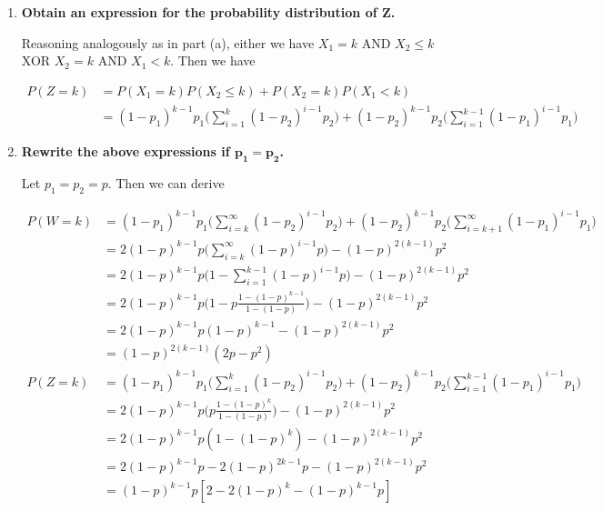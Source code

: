 \documentclass[10pt, oneside]{article}   	%
\theoremstyle{definition}
\begin{document}
\begin{enumerate}[label=8.\arabic*]
\begin{enumerate}
	\item  \begin{tcolorbox}[
	  colback=Cerulean!5!white,
	  colframe=Cerulean!75!black]
	\textbf{Obtain an expression for the probability distribution of $\bm{Z}$.}
	\end{tcolorbox}
	
	Reasoning analogously as in part (a), either we have $X_1 = k$ AND $X_2 \leq k$ XOR $X_2 = k$ AND $X_1 < k$. Then we have
	
	\begin{align*}
	P(Z = k) &= P(X_1 = k) P(X_2 \leq k) + P(X_2 = k) P(X_1 < k) \\
	&= \boxed{ (1-p_1)^{k-1} p_1 \Bigg( \sum^k_{i = 1} (1-p_2)^{i-1} p_2 \Bigg) + (1-p_2)^{k-1} p_2 \Bigg( \sum^{k-1}_{i=1} (1-p_1)^{i-1} p_1 \Bigg)}
	\end{align*}
	
	\item  \begin{tcolorbox}[
	  colback=Cerulean!5!white,
	  colframe=Cerulean!75!black]
	\textbf{Rewrite the above expressions if $\bm{p_1 = p_2}$.}
	\end{tcolorbox}
	
	Let $p_1 = p_2 = p$. Then we can derive
	
	\begin{align*}
	P(W = k) &= (1-p_1)^{k-1} p_1 \Bigg( \sum^{\infty}_{i=k} (1-p_2)^{i-1} p_2 \Bigg) + (1-p_2)^{k-1} p_2 \Bigg( \sum^{\infty}_{i = k+1} (1-p_1)^{i-1} p_1 \Bigg) \\
	&= 2(1-p)^{k-1} p \Bigg( \sum^{\infty}_{i=k} (1-p)^{i-1} p \Bigg) - (1-p)^{2(k-1)} p^2 \\
	&= 2(1-p)^{k-1} p \Bigg( 1 - \sum^{k-1}_{i=1} (1-p)^{i-1} p \Bigg) - (1-p) ^{2(k-1)} p^2 \\
	&= 2(1-p)^{k-1} p \Bigg( 1 - p \frac{1 - (1-p)^{k-1}}{1 - (1-p)} \Bigg) - (1-p)^{2(k-1)} p^2 \\
	&= 2(1-p)^{k-1} p (1-p)^{k-1} - (1-p)^{2(k-1)} p^2 \\
	&= \boxed{(1-p)^{2(k-1)} (2p-p^2)} \\
	P(Z = k) &= (1-p_1)^{k-1} p_1 \Bigg( \sum^k_{i = 1} (1-p_2)^{i-1} p_2 \Bigg) + (1-p_2)^{k-1} p_2 \Bigg( \sum^{k-1}_{i=1} (1-p_1)^{i-1} p_1 \Bigg) \\
	&= 2(1-p)^{k-1} p \Bigg( p \frac{1 - (1-p)^k}{1 - (1-p)} \Bigg) - (1-p)^{2(k-1)} p^2 \\
	&= 2(1-p)^{k-1} p (1 - (1-p)^k) - (1-p)^{2(k-1)} p^2 \\
	&= 2(1-p)^{k-1} p - 2(1-p)^{2k-1} p - (1-p)^{2(k-1)} p^2 \\
	&= \boxed{ (1-p)^{k-1} p [2 - 2(1-p)^k - (1-p)^{k-1} p] }
	\end{align*}
	

\end{enumerate}
\end{enumerate}
\end{document}
